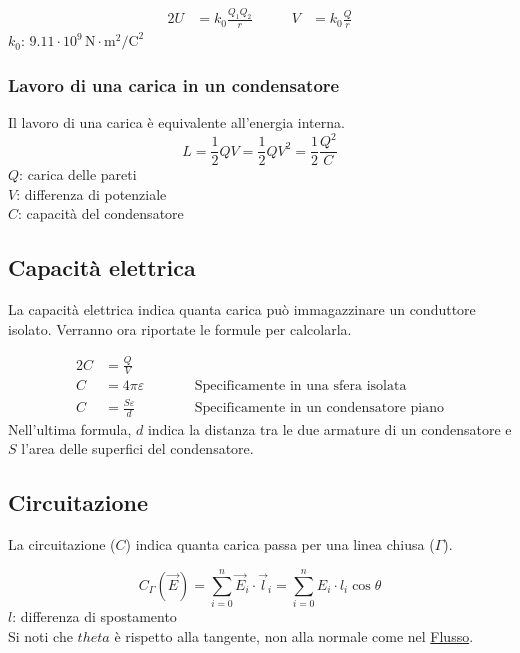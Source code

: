 \begin{alignat*}{2}
U &= k_0\frac{Q_1Q_2}{r} &\qquad V &= k_0\frac{Q}{r}
\end{alignat*}
\hyperref[tab:k0]{$k_0$}: $9.11\cdot10^9\,\text{N}\cdot\text{m}^2\text{/C}^2$

\subsubsection{Lavoro di una carica in un condensatore}
Il lavoro di una carica è equivalente all'energia interna.
\begin{equation*}
L = \frac{1}{2}QV = \frac{1}{2}QV^2 = \frac{1}{2}\frac{Q^2}{C}
\end{equation*}
$Q$: carica delle pareti\\
$V$: differenza di potenziale\\
$C$: capacità del condensatore

\subsection{Capacità elettrica}\label{sub:elettrostatica:capacita}
La capacità elettrica indica quanta carica può immagazzinare un conduttore isolato. Verranno ora 
riportate le formule per calcolarla.

\begin{alignat*}{2}
C &= \frac{Q}{V} &\qquad &\\
C &= 4\pi\varepsilon & &\text{Specificamente in una sfera isolata}\\
C &= \frac{S\varepsilon}{d} & &\text{Specificamente in un condensatore piano}
\end{alignat*}
Nell'ultima formula, $d$ indica la distanza tra le due armature di un condensatore e $S$ l'area 
delle superfici del condensatore.

\subsection{Circuitazione}
La circuitazione ($C$) indica quanta carica passa per una linea chiusa ($\Gamma$).

\begin{equation*}
C_\Gamma\left(\vec{E}\right) = \sum\limits_{i=0}^{n}\vec{E}_i\cdot\vec{l}_i = 
\sum\limits_{i=0}^{n} E_i\cdot l_i\cos\theta
\end{equation*}
$l$: differenza di spostamento\\
Si noti che $theta$ è rispetto alla tangente, non alla normale come nel 
\hyperref[subsec:flusso]{Flusso}.
\begin{center}
\end{center}

